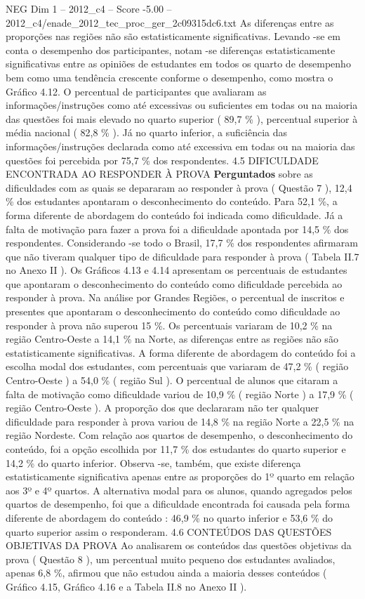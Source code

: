 \begin{textsample}{NEG Dim 1 – 2012\_c4 – Score -5.00 – 2012\_c4/enade\_2012\_tec\_proc\_ger\_2c09315dc6.txt}
As diferenças entre as proporções nas regiões não são estatisticamente significativas.
Levando -se em conta o desempenho dos participantes, notam -se diferenças estatisticamente significativas entre as opiniões de estudantes em todos os quarto de desempenho bem como uma tendência crescente conforme o desempenho, como mostra o Gráfico 4.12.
O percentual de participantes que avaliaram as informações/instruções como até excessivas ou suficientes em todas ou na maioria das questões foi mais elevado no quarto superior ( 89,7 \% ), percentual superior à média nacional ( 82,8 \% ).
Já no quarto inferior, a suficiência das informações/instruções declarada como até excessiva em todas ou na maioria das questões foi percebida por 75,7 \% dos respondentes. 4.5 DIFICULDADE ENCONTRADA AO RESPONDER À PROVA \textbf{Perguntados} sobre as dificuldades com as quais se depararam ao responder à prova ( Questão 7 ), 12,4 \% dos estudantes apontaram o desconhecimento do conteúdo.
Para 52,1 \%, a forma diferente de abordagem do conteúdo foi indicada como dificuldade.
Já a falta de motivação para fazer a prova foi a dificuldade apontada por 14,5 \% dos respondentes.
Considerando -se todo o Brasil, 17,7 \% dos respondentes afirmaram que não tiveram qualquer tipo de dificuldade para responder à prova ( Tabela II.7 no Anexo II ).
Os Gráficos 4.13 e 4.14 apresentam os percentuais de estudantes que apontaram o desconhecimento do conteúdo como dificuldade percebida ao responder à prova.
Na análise por Grandes Regiões, o percentual de inscritos e presentes que apontaram o desconhecimento do conteúdo como dificuldade ao responder à prova não superou 15 \%.
Os percentuais variaram de 10,2 \% na região Centro-Oeste a 14,1 \% na Norte, as diferenças entre as regiões não são estatisticamente significativas.
A forma diferente de abordagem do conteúdo foi a escolha modal dos estudantes, com percentuais que variaram de 47,2 \% ( região Centro-Oeste ) a 54,0 \% ( região Sul ).
O percentual de alunos que citaram a falta de motivação como dificuldade variou de 10,9 \% ( região Norte ) a 17,9 \% ( região Centro-Oeste ).
A proporção dos que declararam não ter qualquer dificuldade para responder à prova variou de 14,8 \% na região Norte a 22,5 \% na região Nordeste.
Com relação aos quartos de desempenho, o desconhecimento do conteúdo, foi a opção escolhida por 11,7 \% dos estudantes do quarto superior e 14,2 \% do quarto inferior.
Observa -se, também, que existe diferença estatisticamente significativa apenas entre as proporções do 1º quarto em relação aos 3º e 4º quartos.
A alternativa modal para os alunos, quando agregados pelos quartos de desempenho, foi que a dificuldade encontrada foi causada pela forma diferente de abordagem do conteúdo : 46,9 \% no quarto inferior e 53,6 \% do quarto superior assim o responderam. 4.6 CONTEÚDOS DAS QUESTÕES OBJETIVAS DA PROVA Ao analisarem os conteúdos das questões objetivas da prova ( Questão 8 ), um percentual muito pequeno dos estudantes avaliados, apenas 6,8 \%, afirmou que não estudou ainda a maioria desses conteúdos ( Gráfico 4.15, Gráfico 4.16 e a Tabela II.8 no Anexo II ).

\end{textsample}

